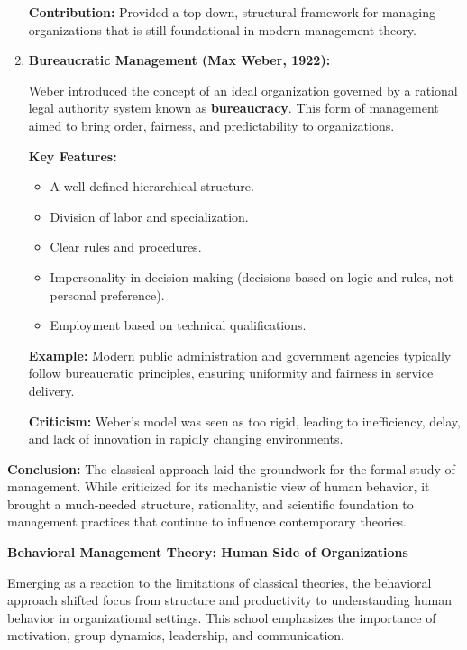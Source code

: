 \documentclass[10pt,a4paper]{book}
\begin{document}
\begin{multicols}{2}
\begin{enumerate}
    \textbf{Contribution:} Provided a top-down, structural framework for managing organizations that is still foundational in modern management theory.

    \item \textbf{Bureaucratic Management (Max Weber, 1922):}

    Weber introduced the concept of an ideal organization governed by a rational legal authority system known as \textbf{bureaucracy}. This form of management aimed to bring order, fairness, and predictability to organizations.

    \textbf{Key Features:}
    \begin{itemize}
        \item A well-defined hierarchical structure.
        \item Division of labor and specialization.
        \item Clear rules and procedures.
        \item Impersonality in decision-making (decisions based on logic and rules, not personal preference).
        \item Employment based on technical qualifications.
    \end{itemize}

    \textbf{Example:} Modern public administration and government agencies typically follow bureaucratic principles, ensuring uniformity and fairness in service delivery.

    \textbf{Criticism:} Weber’s model was seen as too rigid, leading to inefficiency, delay, and lack of innovation in rapidly changing environments.
\end{enumerate}

\textbf{Conclusion:} The classical approach laid the groundwork for the formal study of management. While criticized for its mechanistic view of human behavior, it brought a much-needed structure, rationality, and scientific foundation to management practices that continue to influence contemporary theories.



\textbf{Behavioral Management Theory: Human Side of Organizations}

Emerging as a reaction to the limitations of classical theories, the behavioral approach shifted focus from structure and productivity to understanding human behavior in organizational settings. This school emphasizes the importance of motivation, group dynamics, leadership, and communication.


\end{multicols}
\end{document}

